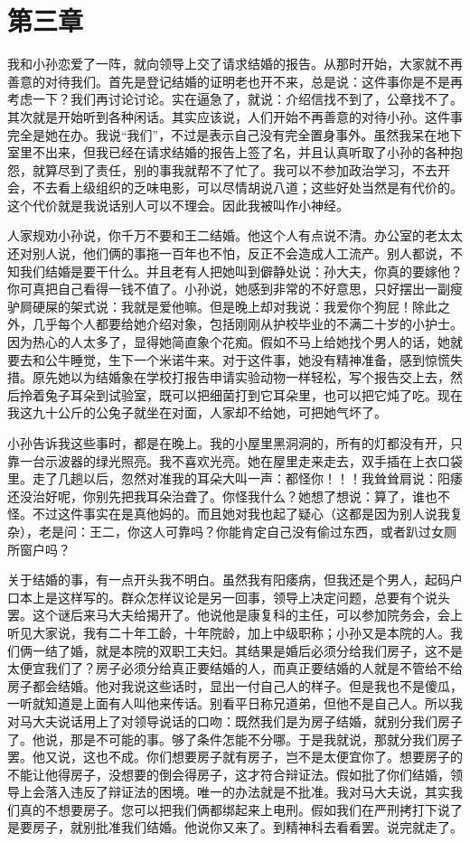 \section{第三章}

我和小孙恋爱了一阵，就向领导上交了请求结婚的报告。从那时开始，大家就不再善意的对待我们。首先是登记结婚的证明老也开不来，总是说：这件事你是不是再考虑一下？我们再讨论讨论。实在逼急了，就说：介绍信找不到了，公章找不了。其次就是开始听到各种闲话。其实应该说，人们开始不再善意的对待小孙。这件事完全是她在办。我说“我们”，不过是表示自己没有完全置身事外。虽然我呆在地下室里不出来，但我已经在请求结婚的报告上签了名，并且认真听取了小孙的各种抱怨，就算尽到了责任，别的事我就帮不了忙了。我可以不参加政治学习，不去开会，不去看上级组织的乏味电影，可以尽情胡说八道；这些好处当然是有代价的。这个代价就是我说话别人可以不理会。因此我被叫作小神经。 

人家规劝小孙说，你千万不要和王二结婚。他这个人有点说不清。办公室的老太太还对别人说，他们俩的事拖一百年也不怕，反正不会造成人工流产。别人都说，不知我们结婚是要干什么。并且老有人把她叫到僻静处说：孙大夫，你真的要嫁他？你可真把自己看得一钱不值了。小孙说，她感到非常的不好意思，只好摆出一副瘦驴屙硬屎的架式说：我就是爱他嘛。但是晚上却对我说：我爱你个狗屁！除此之外，几乎每个人都要给她介绍对象，包括刚刚从护校毕业的不满二十岁的小护士。因为热心的人太多了，显得她简直象个花痴。假如不马上给她找个男人的话，她就要去和公牛睡觉，生下一个米诺牛来。对于这件事，她没有精神准备，感到惊慌失措。原先她以为结婚象在学校打报告申请实验动物一样轻松，写个报告交上去，然后拎着兔子耳朵到试验室，既可以把细菌打到它耳朵里，也可以把它炖了吃。现在我这九十公斤的公兔子就坐在对面，人家却不给她，可把她气坏了。 

小孙告诉我这些事时，都是在晚上。我的小屋里黑洞洞的，所有的灯都没有开，只靠一台示波器的绿光照亮。我不喜欢光亮。她在屋里走来走去，双手插在上衣口袋里。走了几趟以后，忽然对准我的耳朵大叫一声：都怪你！！！我耸耸肩说：阳痿还没治好呢，你别先把我耳朵治聋了。你怪我什么？她想了想说：算了，谁也不怪。不过这件事实在是真他妈的。而且她对我也起了疑心（这都是因为别人说我复杂），老是问：王二，你这人可靠吗？你能肯定自己没有偷过东西，或者趴过女厕所窗户吗？ 

关于结婚的事，有一点开头我不明白。虽然我有阳痿病，但我还是个男人，起码户口本上是这样写的。群众怎样议论是另一回事，领导上决定问题，总要有个说头罢。这个谜后来马大夫给揭开了。他说他是康复科的主任，可以参加院务会，会上听见大家说，我有二十年工龄，十年院龄，加上中级职称；小孙又是本院的人。我们俩一结了婚，就是本院的双职工夫妇。其结果是婚后必须分给我们房子，这不是太便宜我们了？房子必须分给真正要结婚的人，而真正要结婚的人就是不管给不给房子都会结婚。他对我说这些话时，显出一付自己人的样子。但是我也不是傻瓜，一听就知道是上面有人叫他来传话。别看平日称兄道弟，但他不是自己人。所以我对马大夫说话用上了对领导说话的口吻：既然我们是为房子结婚，就别分我们房子了。他说，那是不可能的事。够了条件怎能不分哪。于是我就说，那就分我们房子罢。他又说，这也不成。你们想要房子就有房子，岂不是太便宜你了。想要房子的不能让他得房子，没想要的倒会得房子，这才符合辩证法。假如批了你们结婚，领导上会落入违反了辩证法的困境。唯一的办法就是不批准。我对马大夫说，其实我们真的不想要房子。您可以把我们俩都绑起来上电刑。假如我们在严刑拷打下说了是要房子，就别批准我们结婚。他说你又来了。到精神科去看看罢。说完就走了。 

